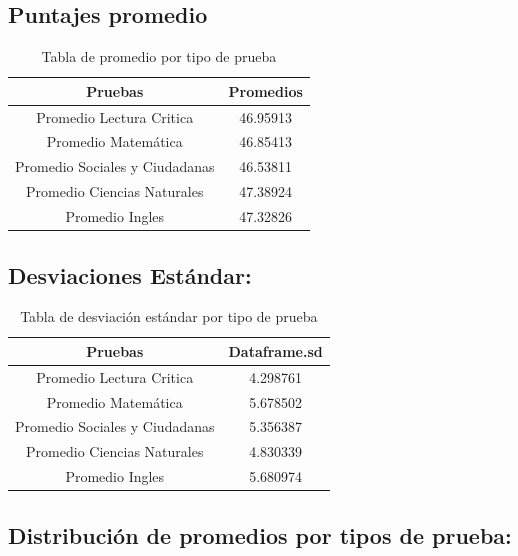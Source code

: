 \documentclass[12pt,a4paper,]{book}
\numberwithin{dummy}{section}
\theoremstyle{ocrenumbox}
\theoremstyle{ocrenumbox}
\theoremstyle{ocrenumbox}
\theoremstyle{ocrenumbox}
\theoremstyle{ocrenum}
\begin{document}
\hypertarget{puntajes-promedio}{%
\subsection{Puntajes promedio}\label{puntajes-promedio}}

\begingroup\fontsize{8}{10}\selectfont

\begin{longtable}[t]{cc}
\caption{\label{tab:unnamed-chunk-13}Tabla de promedio por tipo de prueba}\\
\toprule
Pruebas & Promedios\\
\midrule
Promedio Lectura Critica & 46.95913\\
Promedio Matemática & 46.85413\\
Promedio Sociales y Ciudadanas & 46.53811\\
Promedio Ciencias Naturales & 47.38924\\
Promedio Ingles & 47.32826\\
\bottomrule
\end{longtable}
\endgroup{}

\hypertarget{desviaciones-estuxe1ndar}{%
\subsection{Desviaciones Estándar:}\label{desviaciones-estuxe1ndar}}

\begingroup\fontsize{8}{10}\selectfont

\begin{longtable}[t]{cc}
\caption{\label{tab:unnamed-chunk-14}Tabla de desviación estándar por tipo de prueba}\\
\toprule
Pruebas & Dataframe.sd\\
\midrule
Promedio Lectura Critica & 4.298761\\
Promedio Matemática & 5.678502\\
Promedio Sociales y Ciudadanas & 5.356387\\
Promedio Ciencias Naturales & 4.830339\\
Promedio Ingles & 5.680974\\
\bottomrule
\end{longtable}
\endgroup{}

\hypertarget{distribuciuxf3n-de-promedios-por-tipos-de-prueba}{%
\subsection{Distribución de promedios por tipos de
prueba:}\label{distribuciuxf3n-de-promedios-por-tipos-de-prueba}}
\end{document}
